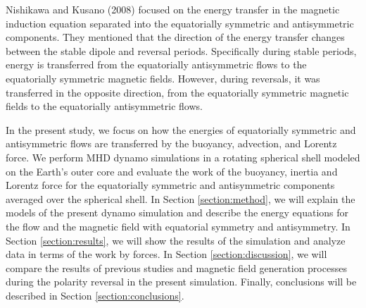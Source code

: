 Nishikawa and Kusano (2008) 
focused on the energy transfer in the magnetic induction equation separated into the equatorially symmetric and antisymmetric components. 
{\color{red}
They
}
mentioned that the direction of the energy transfer changes between the stable dipole and reversal periods. 
{\color{magenta}
Specifically during stable periods, energy is transferred from the equatorially antisymmetric flows to the equatorially symmetric magnetic fields. However, during reversals, it was transferred in the opposite direction, from the equatorially symmetric magnetic fields to the equatorially antisymmetric flows.
}

In the present study, we focus on how the energies of equatorially symmetric and antisymmetric flows are transferred by the buoyancy, advection, and Lorentz force. 
We perform MHD dynamo simulations in a rotating spherical shell modeled on the Earth's outer core and evaluate the work of the buoyancy, inertia %
and Lorentz force for the equatorially symmetric and antisymmetric components averaged over the spherical shell. 
In Section \ref{section:method}, we will explain the models of the present dynamo simulation and describe the energy equations %
{\color{teal}
for the flow and the magnetic field with equatorial symmetry and antisymmetry.
}
In Section \ref{section:results}, we will show the results of the simulation and analyze data in terms of the work by forces. 
In Section \ref{section:discussion}, we will compare %
the results of previous studies and magnetic field generation processes during the polarity reversal in the present simulation. 
Finally, conclusions will be described in Section \ref{section:conclusions}.
